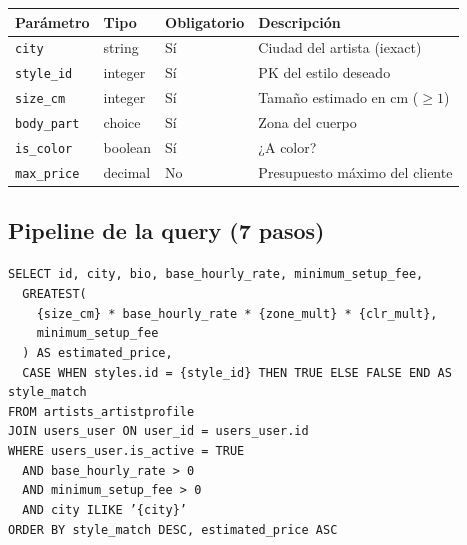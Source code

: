 \documentclass[11pt,a4paper]{article}
\begin{document}
\begin{center}
\begin{tabular}{llll}
\toprule
\rowcolor{blkMid}
\textcolor{blkGold}{\textbf{Parámetro}} &
\textcolor{blkGold}{\textbf{Tipo}} &
\textcolor{blkGold}{\textbf{Obligatorio}} &
\textcolor{blkGold}{\textbf{Descripción}}\\
\midrule
\texttt{city}      & string  & Sí & Ciudad del artista (iexact)\\
\rowcolor{blkMid}
\texttt{style\_id} & integer & Sí & PK del estilo deseado\\
\texttt{size\_cm}  & integer & Sí & Tamaño estimado en cm ($\geq 1$)\\
\rowcolor{blkMid}
\texttt{body\_part}& choice  & Sí & Zona del cuerpo\\
\texttt{is\_color} & boolean & Sí & ¿A color?\\
\rowcolor{blkMid}
\texttt{max\_price}& decimal & No & Presupuesto máximo del cliente\\
\bottomrule
\end{tabular}
\end{center}

\subsection{Pipeline de la query (7 pasos)}

\begin{tcolorbox}[codebox, title={SQL compilado por el ORM — ArtistMatchView.get()}]
\texttt{SELECT id, city, bio, base\_hourly\_rate, minimum\_setup\_fee,}\\
\texttt{\ \ GREATEST(}\\
\texttt{\ \ \ \ \{size\_cm\} * base\_hourly\_rate * \{zone\_mult\} * \{clr\_mult\},}\\
\texttt{\ \ \ \ minimum\_setup\_fee}\\
\texttt{\ \ ) AS estimated\_price,}\\
\texttt{\ \ CASE WHEN styles.id = \{style\_id\} THEN TRUE ELSE FALSE END AS style\_match}\\
\texttt{FROM artists\_artistprofile}\\
\texttt{JOIN users\_user ON user\_id = users\_user.id}\\
\texttt{WHERE users\_user.is\_active = TRUE}\\
\texttt{\ \ AND base\_hourly\_rate > 0}\\
\texttt{\ \ AND minimum\_setup\_fee > 0}\\
\texttt{\ \ AND city ILIKE '\{city\}'}\\
\texttt{ORDER BY style\_match DESC, estimated\_price ASC}
\end{tcolorbox}
\end{document}

